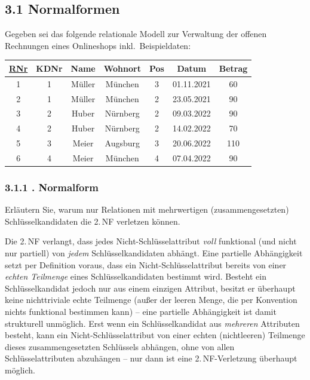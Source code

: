 \documentclass[11pt,a4paper]{article}
\newcommand{\pk}[1]{\underline{#1}}
\begin{document}
\subsection*{3.1 \quad Normalformen}
Gegeben sei das folgende relationale Modell zur Verwaltung der offenen Rechnungen eines Onlineshops inkl.\ Beispieldaten:

\begin{center}
\small
\begin{tabular}{cccccc c}
\toprule
\pk{RNr} & KDNr & Name & Wohnort & Pos & Datum & Betrag\\
\midrule
1 & 1 & M\"uller & M\"unchen & 3 & 01.11.2021 & 60\\
2 & 1 & M\"uller & M\"unchen & 2 & 23.05.2021 & 90\\
3 & 2 & Huber & N\"urnberg & 2 & 09.03.2022 & 90\\
4 & 2 & Huber & N\"urnberg & 2 & 14.02.2022 & 70\\
5 & 3 & Meier & Augsburg & 3 & 20.06.2022 & 110\\
6 & 4 & Meier & M\"unchen & 4 & 07.04.2022 & 90\\
\bottomrule
\end{tabular}
\end{center}

\subsubsection*{3.1.1 . Normalform}
Erl\"autern Sie, warum nur Relationen mit mehrwertigen (zusammengesetzten) Schl\"usselkandidaten die 2.\,NF verletzen k\"onnen.

\begin{loesung}
Die 2.\,NF verlangt, dass jedes Nicht-Schl\"usselattribut \emph{voll} funktional (und nicht nur partiell) von \emph{jedem} Schl\"usselkandidaten abh\"angt. Eine partielle Abh\"angigkeit setzt per Definition voraus, dass ein Nicht-Schl\"usselattribut bereits von einer \emph{echten Teilmenge} eines Schl\"usselkandidaten bestimmt wird. Besteht ein Schl\"usselkandidat jedoch nur aus einem einzigen Attribut, besitzt er \"uberhaupt keine nichttriviale echte Teilmenge (au\ss{}er der leeren Menge, die per Konvention nichts funktional bestimmen kann) -- eine partielle Abh\"angigkeit ist damit strukturell unm\"oglich. Erst wenn ein Schl\"usselkandidat aus \emph{mehreren} Attributen besteht, kann ein Nicht-Schl\"usselattribut von einer echten (nichtleeren) Teilmenge dieses zusammengesetzten Schl\"ussels abh\"angen, ohne von allen Schl\"usselattributen abzuh\"angen -- nur dann ist eine 2.\,NF-Verletzung \"uberhaupt m\"oglich.
\end{loesung}
\end{document}
